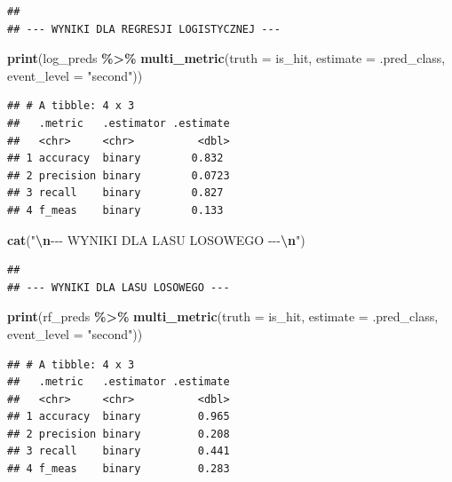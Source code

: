 \documentclass[
]{article}
\newenvironment{Shaded}{\begin{snugshade}}{\end{snugshade}}
\newcommand{\AttributeTok}[1]{\textcolor[rgb]{0.13,0.29,0.53}{#1}}
\newcommand{\FunctionTok}[1]{\textcolor[rgb]{0.13,0.29,0.53}{\textbf{#1}}}
\newcommand{\NormalTok}[1]{#1}
\newcommand{\SpecialCharTok}[1]{\textcolor[rgb]{0.81,0.36,0.00}{\textbf{#1}}}
\newcommand{\StringTok}[1]{\textcolor[rgb]{0.31,0.60,0.02}{#1}}
\begin{document}
\begin{verbatim}
## 
## --- WYNIKI DLA REGRESJI LOGISTYCZNEJ ---
\end{verbatim}

\begin{Shaded}
\begin{Highlighting}[]
\FunctionTok{print}\NormalTok{(log\_preds }\SpecialCharTok{\%\textgreater{}\%} \FunctionTok{multi\_metric}\NormalTok{(}\AttributeTok{truth =}\NormalTok{ is\_hit, }\AttributeTok{estimate =}\NormalTok{ .pred\_class, }\AttributeTok{event\_level =} \StringTok{"second"}\NormalTok{))}
\end{Highlighting}
\end{Shaded}

\begin{verbatim}
## # A tibble: 4 x 3
##   .metric   .estimator .estimate
##   <chr>     <chr>          <dbl>
## 1 accuracy  binary        0.832 
## 2 precision binary        0.0723
## 3 recall    binary        0.827 
## 4 f_meas    binary        0.133
\end{verbatim}

\begin{Shaded}
\begin{Highlighting}[]
\FunctionTok{cat}\NormalTok{(}\StringTok{"}\SpecialCharTok{\textbackslash{}n}\StringTok{{-}{-}{-} WYNIKI DLA LASU LOSOWEGO {-}{-}{-}}\SpecialCharTok{\textbackslash{}n}\StringTok{"}\NormalTok{)}
\end{Highlighting}
\end{Shaded}

\begin{verbatim}
## 
## --- WYNIKI DLA LASU LOSOWEGO ---
\end{verbatim}

\begin{Shaded}
\begin{Highlighting}[]
\FunctionTok{print}\NormalTok{(rf\_preds }\SpecialCharTok{\%\textgreater{}\%} \FunctionTok{multi\_metric}\NormalTok{(}\AttributeTok{truth =}\NormalTok{ is\_hit, }\AttributeTok{estimate =}\NormalTok{ .pred\_class, }\AttributeTok{event\_level =} \StringTok{"second"}\NormalTok{))}
\end{Highlighting}
\end{Shaded}

\begin{verbatim}
## # A tibble: 4 x 3
##   .metric   .estimator .estimate
##   <chr>     <chr>          <dbl>
## 1 accuracy  binary         0.965
## 2 precision binary         0.208
## 3 recall    binary         0.441
## 4 f_meas    binary         0.283
\end{verbatim}
\end{document}
